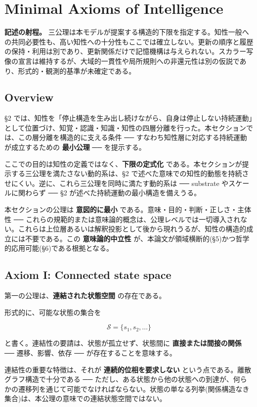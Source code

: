 \section{Minimal Axioms of Intelligence}

\noindent\textbf{記述の射程。} 三公理は本モデルが提案する構造的下限を指定する。知性一般への共同必要性も、高い知性への十分性もここでは確立しない。更新の順序と履歴の保持・利用は別であり、更新関係だけで記憶機構は与えられない。スカラー写像の宣言は維持するが、大域的一貫性や局所規則への非還元性は別の仮説であり、形式的・観測的基準が未確定である。



\subsection{Overview}


\S{}2 では、知性を「停止構造を生み出し続けながら、自身は停止しない持続運動」として位置づけ、知覚・認識・知識・知性の四層分離を行った。本セクションでは、この層分離を構造的に支える条件 ── すなわち知性層に対応する持続運動が成立するための \textbf{最小公理} ── を提示する。

ここでの目的は知性の定義ではなく、\textbf{下限の定式化} である。本セクションが提示する三公理を満たさない動的系は、\S{}2 で述べた意味での知性的動態を持続させにくい。逆に、これら三公理を同時に満たす動的系は ── substrate やスケールに関わらず ── \S{}2 が述べた持続運動の最小構造を備えうる。

本セクションの公理は \textbf{意図的に最小} である。意味・目的・判断・正しさ・主体性 ── これらの規範的または意味論的概念は、公理レベルでは一切導入されない。これらは上位層あるいは解釈投影として後から現れうるが、知性の構造的成立には不要である。この \textbf{意味論的中立性} が、本論文が領域横断的(\S{}5)かつ哲学的応用可能(\S{}6)である根拠となる。

\subsection{Axiom I: Connected state space}


第一の公理は、\textbf{連結された状態空間} の存在である。

形式的に、可能な状態の集合を

\[
\mathcal{S} = \{ s_1, s_2, \dots \}
\]

と書く。連結性の要請は、状態が孤立せず、状態間に \textbf{直接または間接の関係} ── 遷移、影響、依存 ── が存在することを意味する。

連結性の重要な特徴は、それが \textbf{連続的位相を要求しない} という点である。離散グラフ構造で十分である ── ただし、ある状態から他の状態への到達が、何らかの遷移列を通じて可能でなければならない。状態の単なる列挙(関係構造なき集合)は、本公理の意味での連結状態空間ではない。

